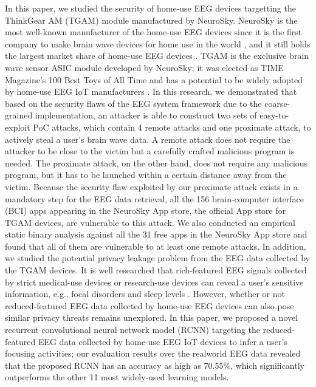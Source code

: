 \indent In this paper, we studied the security of home-use EEG devices targetting the ThinkGear AM (TGAM) module manufactured by NeuroSky. NeuroSky is the most well-known manufacturer of the home-use EEG devices since it is the first company to make brain wave devices for home use in the world \cite{firsthomeeeg}, and it still holds the largest market share of home-use EEG devices \cite{neuroskymarket}. TGAM is the exclusive brain wave sensor ASIC module developed by NeuroSky; it was elected as TIME Magazine's 100 Best Toys of All Time and has a potential to be widely adopted by home-use EEG IoT manufacturers \cite{tgammarket}. In this research, we demonstrated that based on the security flaws of the EEG system framework due to the coarse-grained implementation, an attacker is able to construct two sets of easy-to-exploit PoC attacks, which contain 4 remote attacks and one proximate attack, to actively steal a user's brain wave data. A remote attack does not require the attacker to be close to the victim but a carefully crafted malicious program is needed. The proximate attack, on the other hand, does not require any malicious program, but it has to be launched within a certain distance away from the victim. %
Because the security flaw exploited by our proximate attack exists in a mandatory step for the EEG data retrieval, all the 156 brain-computer interface (BCI) apps appearing in the NeuroSky App store, the official App store for TGAM devices, are vulnerable to this attack. We also conducted an empirical static binary analysis against all the 31 free apps in the NeuroSky App store and found that all of them are vulnerable to at least one remote attacks. %
\indent In addition, we studied the potential privacy leakage problem from the EEG data collected by the TGAM devices. It is well researched that rich-featured EEG signals collected by strict medical-use devices or research-use devices can reveal a user's sensitive information, e.g., focal disorders \cite{eegdiagnosis} \cite{dauwels2010diagnosis} and sleep levels \cite{nakamura2017automatic}. However, whether or not reduced-featured EEG data collected by home-use EEG devices can also pose similar privacy threats remains unexplored. In this paper, we proposed a novel recurrent convolutional neural network model (RCNN) targeting the reduced-featured EEG data collected by home-use EEG IoT devices to infer a user's focusing activities; our evaluation results over the realworld EEG data revealed that the proposed RCNN has an accuracy as high as 70.55\%, which significantly outperforms the other 11 most widely-used learning models.\\
